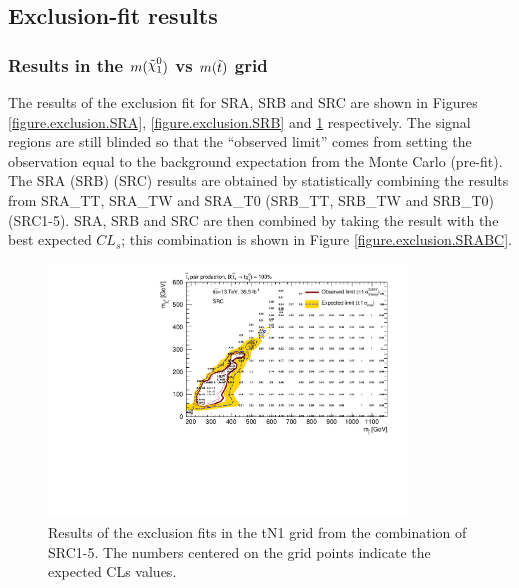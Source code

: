 \subsection{Exclusion-fit results}

\subsubsection{Results in the $m(\ninoone)$ vs $m(\tilde{t})$ grid}

The results of the exclusion fit for SRA, SRB and SRC are shown in 
Figures \ref{figure.exclusion.SRA}, \ref{figure.exclusion.SRB} and
\ref{figure.exclusion.SRC} respectively. The signal regions are still
blinded so that the ``observed limit'' comes from setting the
observation equal to the background expectation from the Monte Carlo
(pre-fit).
The SRA (SRB) (SRC) results are
obtained by statistically combining the results from 
SRA\_TT, SRA\_TW and SRA\_T0 (SRB\_TT, SRB\_TW and SRB\_T0) (SRC1-5).
SRA, SRB and SRC are then combined by  taking the result with the best expected
$CL_s$; this combination is shown in Figure
\ref{figure.exclusion.SRABC}.

\begin{figure}[htbp]
	\begin{center}
		\includegraphics[width=0.85\textwidth]{HistFitterStuff/SRC_exclusion.pdf}
		\caption{Results of the exclusion fits in the tN1 grid from the
      combination of SRC1-5.  The numbers centered on the grid points
      indicate the expected CLs values.}
		\label{figure.exclusion.SRC}
	\end{center}
\end{figure}

